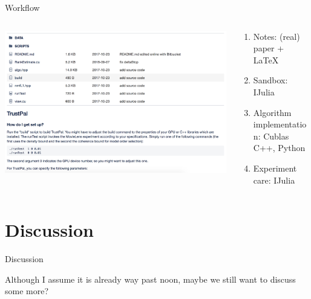 \documentclass[aspectratio=169,10pt]{beamer}
\begin{document}
\begin{frame}[fragile]{Workflow}
\begin{columns}
\begin{column}{0.6\textwidth}
\includegraphics[width=\textwidth]{img/sibyRepo.png}
\end{column}
\begin{column}{0.35\textwidth}
  \begin{enumerate}
    \item Notes: (real) paper + \LaTeX
    \item Sandbox: IJulia
    \item Algorithm implementation: Cublas C++, Python
    \item Experiment care: IJulia
\end{enumerate}  
\end{column}
\end{columns}
\end{frame}



\section{Discussion}
\begin{frame}[standout]{Discussion}
\begin{center}
    \LARGE{Although I assume it is already way past noon, maybe we still want to discuss some more?}
\end{center}
\end{frame}
\end{document}
